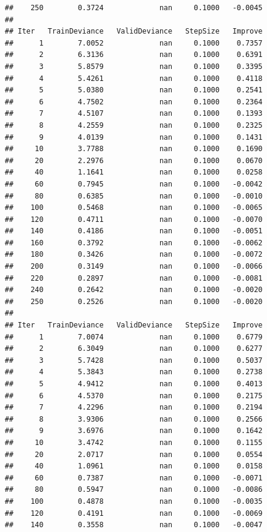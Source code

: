 \documentclass[]{book}
\begin{document}
\begin{verbatim}
##    250        0.3724             nan     0.1000   -0.0045
## 
## Iter   TrainDeviance   ValidDeviance   StepSize   Improve
##      1        7.0052             nan     0.1000    0.7357
##      2        6.3136             nan     0.1000    0.6391
##      3        5.8579             nan     0.1000    0.3395
##      4        5.4261             nan     0.1000    0.4118
##      5        5.0380             nan     0.1000    0.2541
##      6        4.7502             nan     0.1000    0.2364
##      7        4.5107             nan     0.1000    0.1393
##      8        4.2559             nan     0.1000    0.2325
##      9        4.0139             nan     0.1000    0.1431
##     10        3.7788             nan     0.1000    0.1690
##     20        2.2976             nan     0.1000    0.0670
##     40        1.1641             nan     0.1000    0.0258
##     60        0.7945             nan     0.1000   -0.0042
##     80        0.6385             nan     0.1000   -0.0010
##    100        0.5468             nan     0.1000   -0.0065
##    120        0.4711             nan     0.1000   -0.0070
##    140        0.4186             nan     0.1000   -0.0051
##    160        0.3792             nan     0.1000   -0.0062
##    180        0.3426             nan     0.1000   -0.0072
##    200        0.3149             nan     0.1000   -0.0066
##    220        0.2897             nan     0.1000   -0.0081
##    240        0.2642             nan     0.1000   -0.0020
##    250        0.2526             nan     0.1000   -0.0020
## 
## Iter   TrainDeviance   ValidDeviance   StepSize   Improve
##      1        7.0074             nan     0.1000    0.6779
##      2        6.3049             nan     0.1000    0.6277
##      3        5.7428             nan     0.1000    0.5037
##      4        5.3843             nan     0.1000    0.2738
##      5        4.9412             nan     0.1000    0.4013
##      6        4.5370             nan     0.1000    0.2175
##      7        4.2296             nan     0.1000    0.2194
##      8        3.9306             nan     0.1000    0.2566
##      9        3.6976             nan     0.1000    0.1642
##     10        3.4742             nan     0.1000    0.1155
##     20        2.0717             nan     0.1000    0.0554
##     40        1.0961             nan     0.1000    0.0158
##     60        0.7387             nan     0.1000   -0.0071
##     80        0.5947             nan     0.1000   -0.0086
##    100        0.4878             nan     0.1000   -0.0035
##    120        0.4191             nan     0.1000   -0.0069
##    140        0.3558             nan     0.1000   -0.0047

\end{verbatim}
\end{document}
